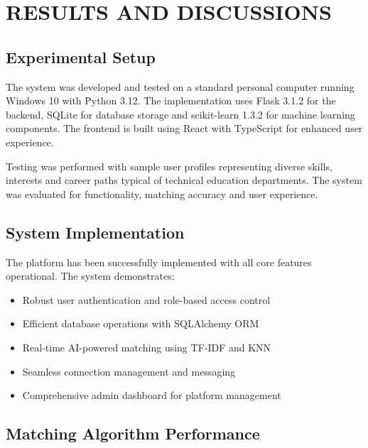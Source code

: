 \documentclass[12pt,a4paper]{report}
\let\origsection\section
\renewcommand{\section}{\needspace{4\baselineskip}\origsection}
\begin{document}

\chapter{RESULTS AND DISCUSSIONS}
\thispagestyle{fancy}

\section{Experimental Setup}

The system was developed and tested on a standard personal computer running Windows 10 with Python 3.12. The implementation uses Flask 3.1.2 for the backend, SQLite for database storage and scikit-learn 1.3.2 for machine learning components. The frontend is built using React with TypeScript for enhanced user experience.

\medskip

\noindent
Testing was performed with sample user profiles representing diverse skills, interests and career paths typical of technical education departments. The system was evaluated for functionality, matching accuracy and user experience.

\section{System Implementation}

The platform has been successfully implemented with all core features operational. The system demonstrates:

\begin{itemize}[noitemsep]
    \item Robust user authentication and role-based access control
    \item Efficient database operations with SQLAlchemy ORM
    \item Real-time AI-powered matching using TF-IDF and KNN
    \item Seamless connection management and messaging
    \item Comprehensive admin dashboard for platform management
\end{itemize}

\section{Matching Algorithm Performance}
\end{document}
